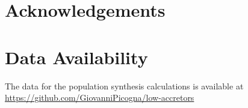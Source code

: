 \documentclass[fleqn,usenatbib,letters]{mnras}
\begin{document}
\section*{Acknowledgements}

\section*{Data Availability}

The data for the population synthesis calculations is available at \href{https://github.com/GiovanniPicogna/low-accretors}{https://github.com/GiovanniPicogna/low-accretors}







\appendix


\bsp	%
\label{lastpage}
\end{document}
